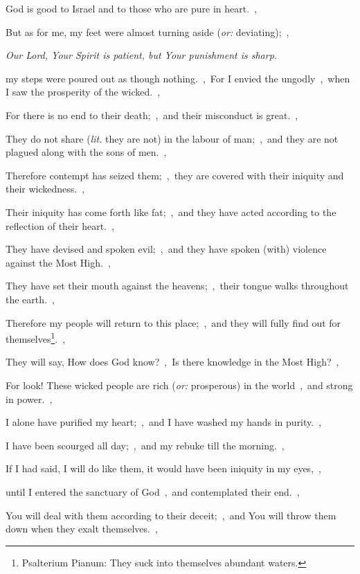 \documentclass[12pt,twoside,a5paper]{article}
\newcommand{\qanona}[1]{{\liturgicalhint{Qanona.} \emph{#1}}}
\newcommand{\translationoption}[1]{\emph{or:} #1}
\newcommand{\translationliteral}[1]{\emph{lit.} #1}
\begin{document}
\begin{normalparskip}
  God is good to Israel and to those who are pure in heart.~\sep

  But as for me, my feet were almost turning aside (\translationoption{deviating});~\sep

  \qanona{Our Lord, Your Spirit is patient, but Your punishment is sharp.}

  my steps were poured out as though nothing.~\sep\ For I envied the ungodly~\sep\ when I saw the prosperity of the wicked.~\sep

  For there is no end to their death;~\sep\ and their misconduct is great.~\sep

  They do not share (\translationliteral{they are not}) in the labour of man;~\sep\ and they are not plagued along with the sons of men.~\sep

  Therefore contempt has seized them;~\sep\ they are covered with their iniquity and their wickedness.~\sep

  Their iniquity has come forth like fat;~\sep\ and they have acted according to the reflection of their heart.~\sep

  They have devised and spoken evil;~\sep\ and they have spoken (with) violence against the Most High.~\sep

  They have set their mouth against the heavens;~\sep\ their tongue walks throughout the earth.~\sep

  Therefore my people will return to this place;~\sep\ and they will fully find out for themselves\footnote{Psalterium Pianum: They suck into themselves abundant waters.}.~\sep

  They will say, How does God know?~\sep\ Is there knowledge in the Most High?~\sep

  For look! These wicked people are rich (\translationoption{prosperous}) in the world~\sep\ and strong in power.~\sep

  I alone have purified my heart;~\sep\ and I have washed my hands in purity.~\sep

  I have been scourged all day;~\sep\ and my rebuke till the morning.~\sep

  If I had said, I will do like them, it would have been iniquity in my eyes,~\sep

  until I entered the sanctuary of God~\sep\ and contemplated their end.~\sep

  You will deal with them according to their deceit;~\sep\ and You will throw them down when they exalt themselves.~\sep


\end{normalparskip}
\end{document}
